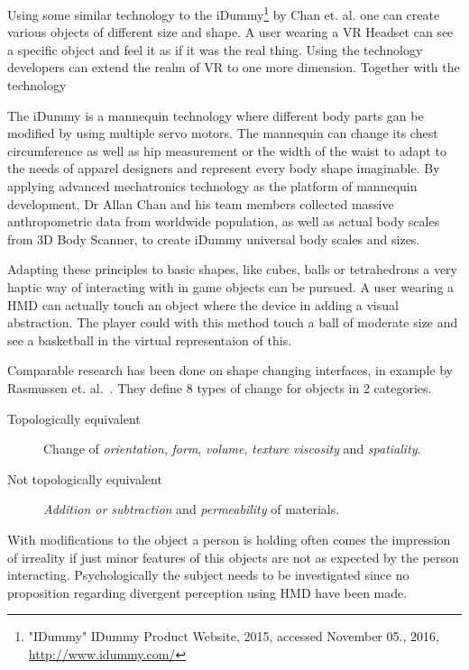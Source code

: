 Using some similar technology to the iDummy\footnote{"IDummy" IDummy Product Website, 2015, accessed November 05., 2016, \url{http://www.idummy.com/}} by Chan et. al. one can create various objects of different size and shape. A user wearing a VR Headset can see a specific object and feel it as if it was the real thing. Using the technology developers can extend the realm of VR to one more dimension. Together with the technology~\cite{Azmandian:2016:HRD:2858036.2858226}

The iDummy is a mannequin technology where different body parts gan be modified by using multiple servo motors. The mannequin can change its chest circumference as well as hip measurement or the width of the waist to adapt to the needs of apparel designers and represent every body shape imaginable. 
By applying advanced mechatronics technology as the platform of mannequin development, Dr Allan Chan and his team members collected massive anthropometric data from worldwide population, as well as actual body scales from 3D Body Scanner, to create iDummy universal body scales and sizes. 

Adapting these principles to basic shapes, like cubes, balls or tetrahedrons a very haptic way of interacting with in game objects can be pursued. A user wearing a HMD can actually touch an object where the device in adding a visual abstraction. The player could with this method touch a ball of moderate size and see a basketball in the virtual representaion of this.

Comparable research has been done on shape changing interfaces, in example by Rasmussen et. al.~\cite{Rasmussen:2012:SIR:2207676.2207781}. They define 8 types of change for objects in 2 categories. 

\begin{description}
	\item[Topologically equivalent] Change of \textit{orientation}, \textit{form},  \textit{volume}, \textit{texture} \textit{viscosity} and \textit{spatiality}.
	\item[Not topologically equivalent] \textit{Addition or subtraction} and \textit{permeability} of materials.
\end{description}

With modifications to the object a person is holding often comes the impression of irreality if just minor features of this objects are not as expected by the person interacting. 
Psychologically the subject needs to be investigated since no proposition regarding divergent perception using HMD have been made.

